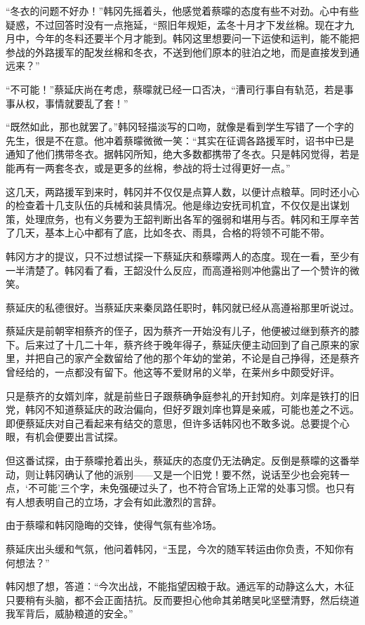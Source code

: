 “冬衣的问题不好办！”韩冈先摇着头，他感觉着蔡曚的态度有些不对劲。心中有些疑惑，不过回答时没有一点拖延，“照旧年规矩，孟冬十月才下发丝棉。现在才九月中，今年的冬料还要半个月才能到。韩冈这里想要问一下运使和运判，能不能把参战的外路援军的配发丝棉和冬衣，不送到他们原本的驻泊之地，而是直接发到通远来？”

“不可能！”蔡延庆尚在考虑，蔡曚就已经一口否决，“漕司行事自有轨范，若是事事从权，事情就要乱了套！”

“既然如此，那也就罢了。”韩冈轻描淡写的口吻，就像是看到学生写错了一个字的先生，很是不在意。他冲着蔡曚微微一笑：“其实在征调各路援军时，诏书中已是通知了他们携带冬衣。据韩冈所知，绝大多数都携带了冬衣。只是韩冈觉得，若是能再有一两套冬衣，或是更多的丝棉，参战的将士过得更好一点。”

这几天，两路援军到来时，韩冈并不仅仅是点算人数，以便计点粮草。同时还小心的检查着十几支队伍的兵械和装具情况。他是缘边安抚司机宜，不仅仅是出谋划策，处理庶务，也有义务要为王韶判断出各军的强弱和堪用与否。韩冈和王厚辛苦了几天，基本上心中都有了底，比如冬衣、雨具，合格的将领不可能不带。

韩冈方才的提议，只不过想试探一下蔡延庆和蔡曚两人的态度。现在一看，至少有一半清楚了。韩冈看了看，王韶没什么反应，而高遵裕则冲他露出了一个赞许的微笑。

蔡延庆的私德很好。当蔡延庆来秦凤路任职时，韩冈就已经从高遵裕那里听说过。

蔡延庆是前朝宰相蔡齐的侄子，因为蔡齐一开始没有儿子，他便被过继到蔡齐的膝下。后来过了十几二十年，蔡齐终于晚年得子，蔡延庆便主动回到了自己原来的家里，并把自己的家产全数留给了他的那个年幼的堂弟，不论是自己挣得，还是蔡齐曾经给的，一点都没有留下。他这等不爱财帛的义举，在莱州乡中颇受好评。

只是蔡齐的女婿刘庠，就是前些日子跟蔡确争庭参礼的开封知府。刘庠是铁打的旧党，韩冈不知道蔡延庆的政治偏向，但好歹跟刘庠也算是亲戚，可能也差之不远。即便蔡延庆对自己看起来有结交的意思，但许多话韩冈也不敢多说。总要提个心眼，有机会便要出言试探。

但这番试探，由于蔡曚抢着出头，蔡延庆的态度仍无法确定。反倒是蔡曚的这番举动，则让韩冈确认了他的派别——又是一个旧党！要不然，说话至少也会宛转一点，‘不可能’三个字，未免强硬过头了，也不符合官场上正常的处事习惯。也只有有人想表明自己的立场，才会有如此激烈的言辞。

由于蔡曚和韩冈隐晦的交锋，使得气氛有些冷场。

蔡延庆出头缓和气氛，他问着韩冈，“玉昆，今次的随军转运由你负责，不知你有何想法？”

韩冈想了想，答道：“今次出战，不能指望因粮于敌。通远军的动静这么大，木征只要稍有头脑，都不会正面拮抗。反而要担心他命其弟瞎吴叱坚壁清野，然后绕道我军背后，威胁粮道的安全。”

